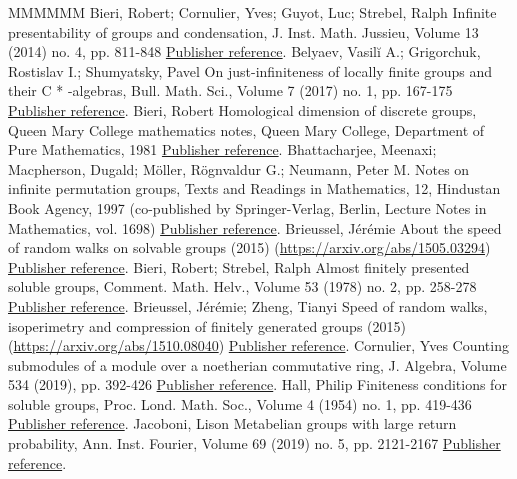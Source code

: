 \documentclass[11pt]{article}
\theoremstyle{definition}
\numberwithin{equation}{section}
\numberwithin{figure}{section}
\numberwithin{table}{section}
\begin{document}
\begin{thebibliography}{MMMMMM}
 Bieri, Robert; Cornulier, Yves; Guyot, Luc; Strebel, Ralph Infinite presentability of groups and condensation, J. Inst. Math. Jussieu, Volume 13 (2014) no. 4, pp. 811-848 \href{https://ahl.centre-mersenne.org/item/AHL_2020__3__981_0/#BCGS}{Publisher reference}.
 Belyaev, Vasilĭ A.; Grigorchuk, Rostislav I.; Shumyatsky, Pavel On just-infiniteness of locally finite groups and their C * -algebras, Bull. Math. Sci., Volume 7 (2017) no. 1, pp. 167-175 \href{https://ahl.centre-mersenne.org/item/AHL_2020__3__981_0/#BGS}{Publisher reference}.
 Bieri, Robert Homological dimension of discrete groups, Queen Mary College mathematics notes, Queen Mary College, Department of Pure Mathematics, 1981 \href{https://ahl.centre-mersenne.org/item/AHL_2020__3__981_0/#B}{Publisher reference}.
 Bhattacharjee, Meenaxi; Macpherson, Dugald; Möller, Rögnvaldur G.; Neumann, Peter M. Notes on infinite permutation groups, Texts and Readings in Mathematics, 12, Hindustan Book Agency, 1997 (co-published by Springer-Verlag, Berlin, Lecture Notes in Mathematics, vol. 1698) \href{https://ahl.centre-mersenne.org/item/AHL_2020__3__981_0/#perms}{Publisher reference}.
 Brieussel, Jérémie About the speed of random walks on solvable groups (2015) (\url{https://arxiv.org/abs/1505.03294}) \href{https://ahl.centre-mersenne.org/item/AHL_2020__3__981_0/#Brieussel}{Publisher reference}.
 Bieri, Robert; Strebel, Ralph Almost finitely presented soluble groups, Comment. Math. Helv., Volume 53 (1978) no. 2, pp. 258-278 \href{https://ahl.centre-mersenne.org/item/AHL_2020__3__981_0/#BS}{Publisher reference}.
 Brieussel, Jérémie; Zheng, Tianyi Speed of random walks, isoperimetry and compression of finitely generated groups (2015) (\url{https://arxiv.org/abs/1510.08040}) \href{https://ahl.centre-mersenne.org/item/AHL_2020__3__981_0/#BZ}{Publisher reference}.
 Cornulier, Yves Counting submodules of a module over a noetherian commutative ring, J. Algebra, Volume 534 (2019), pp. 392-426 \href{https://ahl.centre-mersenne.org/item/AHL_2020__3__981_0/#Cor18}{Publisher reference}.
 Hall, Philip Finiteness conditions for soluble groups, Proc. Lond. Math. Soc., Volume 4 (1954) no. 1, pp. 419-436 \href{https://ahl.centre-mersenne.org/item/AHL_2020__3__981_0/#Hall54}{Publisher reference}.
 Jacoboni, Lison Metabelian groups with large return probability, Ann. Inst. Fourier, Volume 69 (2019) no. 5, pp. 2121-2167 \href{https://ahl.centre-mersenne.org/item/AHL_2020__3__981_0/#J}{Publisher reference}.

\end{thebibliography}
\end{document}
